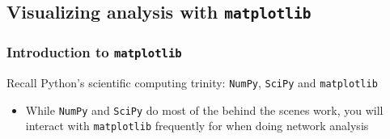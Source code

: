 \documentclass[xcolor=dvipsnames, 9pt]{beamer}
\begin{document}

\subsection{Visualizing analysis with \texttt{matplotlib}} %
\label{sub:visualizing_analysis_with_matplotlib}

\begin{frame}[fragile]
    \frametitle{Introduction to \texttt{matplotlib}}
    Recall Python's scientific computing trinity: \texttt{NumPy}, \texttt{SciPy} and \texttt{matplotlib}
    \begin{itemize}
        \item While \texttt{NumPy} and \texttt{SciPy} do most of the behind the scenes work, you will interact with \texttt{matplotlib} frequently for when doing network analysis
    \end{itemize}
    \begin{columns}
        \begin{enumerate}
        \end{enumerate}
    \end{columns}
\end{frame}
\end{document}
